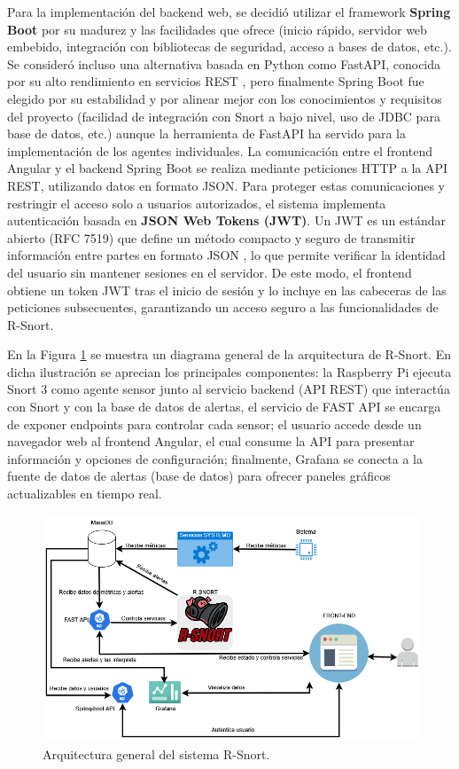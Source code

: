 \documentclass[11pt,a4paper,twoside]{report}
\begin{document}
Para la implementación del backend web, se decidió utilizar el framework \textbf{Spring Boot} por su madurez y las facilidades que ofrece (inicio rápido, servidor web embebido, integración con bibliotecas de seguridad, acceso a bases de datos, etc.). Se consideró incluso una alternativa basada en Python como FastAPI, conocida por su alto rendimiento en servicios REST \cite{FastAPI}, pero finalmente Spring Boot fue elegido por su estabilidad y por alinear mejor con los conocimientos y requisitos del proyecto (facilidad de integración con Snort a bajo nivel, uso de JDBC para base de datos, etc.) aunque la herramienta de FastAPI ha servido para la implementación de los agentes individuales. La comunicación entre el frontend Angular y el backend Spring Boot se realiza mediante peticiones HTTP a la API REST, utilizando datos en formato JSON. Para proteger estas comunicaciones y restringir el acceso solo a usuarios autorizados, el sistema implementa autenticación basada en \textbf{JSON Web Tokens (JWT)}. Un JWT es un estándar abierto (RFC 7519) que define un método compacto y seguro de transmitir información entre partes en formato JSON \cite{JWT}, lo que permite verificar la identidad del usuario sin mantener sesiones en el servidor. De este modo, el frontend obtiene un token JWT tras el inicio de sesión y lo incluye en las cabeceras de las peticiones subsecuentes, garantizando un acceso seguro a las funcionalidades de R-Snort.\newline

En la Figura \ref{fig:arquitectura-general} se muestra un diagrama general de la arquitectura de R-Snort. En dicha ilustración se aprecian los principales componentes: la Raspberry Pi ejecuta Snort 3 como agente sensor junto al servicio backend (API REST) que interactúa con Snort y con la base de datos de alertas, el servicio de FAST API se encarga de exponer endpoints para controlar cada sensor; el usuario accede desde un navegador web al frontend Angular, el cual consume la API para presentar información y opciones de configuración; finalmente, Grafana se conecta a la fuente de datos de alertas (base de datos) para ofrecer paneles gráficos actualizables en tiempo real.\newline

\begin{figure}[hbtp]
	\centering
	 \includegraphics[width=1\textwidth]{documento/5.png}
	\caption{Arquitectura general del sistema R-Snort.}
	\label{fig:arquitectura-general}
\end{figure}
\end{document}
